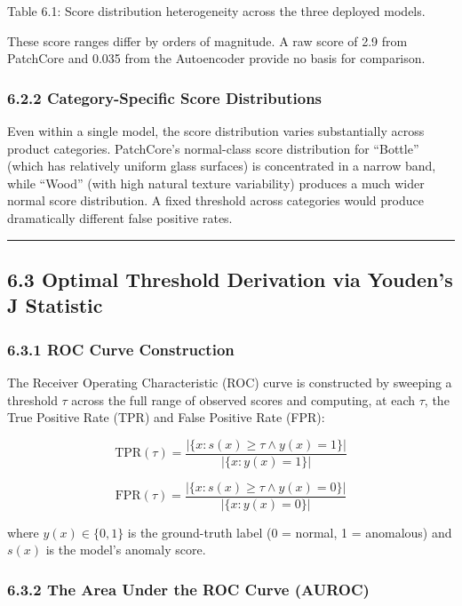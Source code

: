 Table 6.1: Score distribution heterogeneity across the three deployed models.

These score ranges differ by orders of magnitude. A raw score of 2.9 from PatchCore and 0.035 from the Autoencoder provide no basis for comparison.

\subsubsection{6.2.2 Category-Specific Score Distributions}\label{category-specific-score-distributions}

Even within a single model, the score distribution varies substantially across product categories. PatchCore's normal-class score distribution for ``Bottle'' (which has relatively uniform glass surfaces) is concentrated in a narrow band, while ``Wood'' (with high natural texture variability) produces a much wider normal score distribution. A fixed threshold across categories would produce dramatically different false positive rates.

\begin{center}\rule{0.5\linewidth}{0.5pt}\end{center}

\subsection{6.3 Optimal Threshold Derivation via Youden's J Statistic}\label{optimal-threshold-derivation-via-youdens-j-statistic}

\subsubsection{6.3.1 ROC Curve Construction}\label{roc-curve-construction}

The Receiver Operating Characteristic (ROC) curve is constructed by sweeping a threshold \(\tau\) across the full range of observed scores and computing, at each \(\tau\), the True Positive Rate (TPR) and False Positive Rate (FPR):

\[\text{TPR}(\tau) = \frac{|\{x : s(x) \geq \tau \land y(x) = 1\}|}{|\{x : y(x) = 1\}|}\]

\[\text{FPR}(\tau) = \frac{|\{x : s(x) \geq \tau \land y(x) = 0\}|}{|\{x : y(x) = 0\}|}\]

where \(y(x) \in \{0, 1\}\) is the ground-truth label (0 = normal, 1 = anomalous) and \(s(x)\) is the model's anomaly score.

\subsubsection{6.3.2 The Area Under the ROC Curve (AUROC)}\label{the-area-under-the-roc-curve-auroc}

